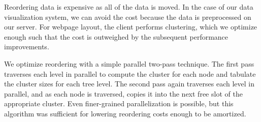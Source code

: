 Reordering data is expensive as all of the data is moved. In the case of our data visualization system, we can avoid the cost because the data is preprocessed on our server. For webpage layout, the client performs clustering, which we optimize enough such that the cost is outweighed by the subsequent performance improvements.

We optimize reordering with a simple parallel two-pass technique. The first pass traverses each level in parallel to compute the cluster for each node and tabulate the cluster sizes for each tree level. The second pass again traverses each level in parallel, and as each node is traversed, copies it into the next free slot of the appropriate cluster. Even finer-grained parallelization is possible, but this algorithm was sufficient for lowering reordering costs enough to be amortized.

